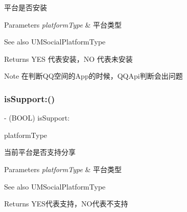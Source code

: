 平台是否安装


\begin{DoxyParams}{Parameters}
{\em platform\+Type} & 平台类型 \\
\hline
\end{DoxyParams}
\begin{DoxySeeAlso}{See also}
U\+M\+Social\+Platform\+Type
\end{DoxySeeAlso}
\begin{DoxyReturn}{Returns}
Y\+ES 代表安装，\+NO 代表未安装 
\end{DoxyReturn}
\begin{DoxyNote}{Note}
在判断\+Q\+Q空间的\+App的时候，\+Q\+Q\+Api判断会出问题 
\end{DoxyNote}
\mbox{\label{interface_u_m_social_manager_a6a44376e989d35045a419deb79f535ef}} 
\subsubsection{\texorpdfstring{is\+Support\+:()}{isSupport:()}\hspace{0.1cm}{\footnotesize\ttfamily [1/2]}}
{\footnotesize\ttfamily -\/ (B\+O\+OL) is\+Support\+: \begin{DoxyParamCaption}\item[{(U\+M\+Social\+Platform\+Type)}]{platform\+Type }\end{DoxyParamCaption}}

当前平台是否支持分享


\begin{DoxyParams}{Parameters}
{\em platform\+Type} & 平台类型 \\
\hline
\end{DoxyParams}
\begin{DoxySeeAlso}{See also}
U\+M\+Social\+Platform\+Type
\end{DoxySeeAlso}
\begin{DoxyReturn}{Returns}
Y\+E\+S代表支持，\+N\+O代表不支持 
\end{DoxyReturn}
\mbox{\label{interface_u_m_social_manager_a6a44376e989d35045a419deb79f535ef}} 
